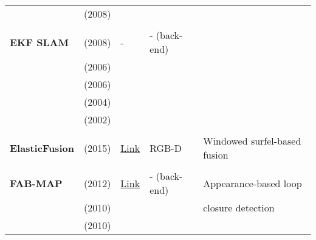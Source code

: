 \documentclass[a4paper,12pt]{scrartcl}
\begin{document}
{\begin{longtable}{l|l|l|l|l}
                           & \cite{Zhou2008} (2008)            &                                                                    &                       &\\
                           &                                   &                                                                    &                       &\\
    \textbf{EKF SLAM}      & \cite{Paz2008} (2008)             & -                                                                  & - (back-end)          &\\
                           & \cite{Bailey2006} (2006)          &                                                                    &                       &\\
                           & \cite{Bailey2006a} (2006)         &                                                                    &                       &\\
                           & \cite{Riisgaard2004} (2004)       &                                                                    &                       &\\
                           & \cite{Thrun1999} (2002)           &                                                                    &                       &\\
                           &                                   &                                                                    &                       &\\
    \textbf{ElasticFusion} & \cite{Whelan2015} (2015)          & {\href{https://github.com/mp3guy/ElasticFusion}{Link}}             & RGB-D                 & Windowed surfel-based fusion\\
                           &                                   &                                                                    &                       &\\
    \textbf{FAB-MAP}       & \cite{Glover2012} (2012)          & {\href{https://github.com/arrenglover/openfabmap}{Link}}           & - (back-end)          & Appearance-based loop\\
                           & \cite{Glover2010} (2010)          &                                                                    &                       & closure detection\\
                           & \cite{Paul2010} (2010)            &                                                                    &                       &\\

\end{longtable}}
\end{document}
